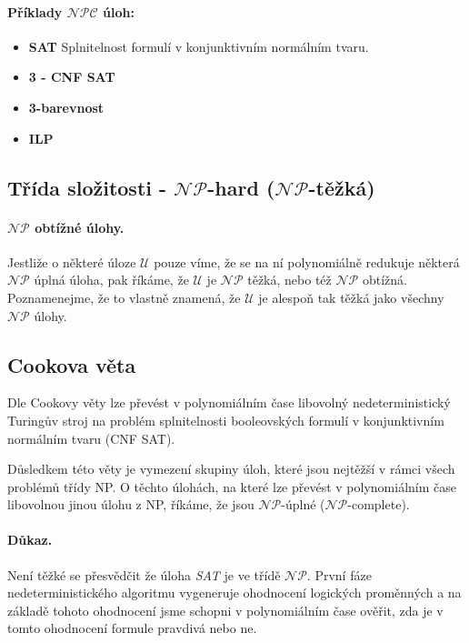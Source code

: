 \paragraph{Příklady $\mathcal{NPC}$ úloh:}
\begin{itemize}[itemsep=0pt]
    \item \textbf{\color{darkBrown}SAT} Splnitelnost formulí v konjunktivním normálním tvaru.
    
    \item \textbf{\color{darkBrown}3 - CNF SAT}
    
    \item \textbf{\color{darkBrown}3-barevnost}
    
    \item \textbf{\color{darkBrown}ILP}
\end{itemize}

\subsection{Třída složitosti - $\mathcal{NP}$-hard ($\mathcal{NP}$-těžká)}
\label{heading:nphard}

\paragraph{$\mathcal{NP}$ obtížné úlohy.} Jestliže o některé úloze $\mathcal{U}$ pouze víme, že se na ní polynomiálně redukuje některá $\mathcal{NP}$ úplná úloha, pak říkáme, že $\mathcal{U}$ je $\mathcal{NP}$ těžká, nebo též $\mathcal{NP}$ obtížná. Poznamenejme, že to vlastně znamená, že $\mathcal{U}$ je alespoň tak těžká jako všechny $\mathcal{NP}$ úlohy.

\subsection{Cookova věta}
Dle Cookovy věty lze převést v polynomiálním čase libovolný nedeterministický Turingův stroj na problém splnitelnosti booleovských formulí v konjunktivním normálním tvaru (CNF SAT).

Důsledkem této věty je vymezení skupiny úloh, které jsou nejtěžší v rámci všech problémů třídy NP. O těchto úlohách, na které lze převést v polynomiálním čase libovolnou jinou úlohu z NP, říkáme, že jsou $\mathcal{NP}$-úplné ($\mathcal{NP}$-complete).

\paragraph{Důkaz.} Není těžké se přesvědčit že úloha \textit{SAT} je ve třídě $\mathcal{NP}$. První fáze nedeterministického algoritmu vygeneruje ohodnocení logických proměnných a na základě tohoto ohodnocení jsme schopni v polynomiálním čase ověřit, zda je v tomto ohodnocení formule pravdivá nebo ne.

